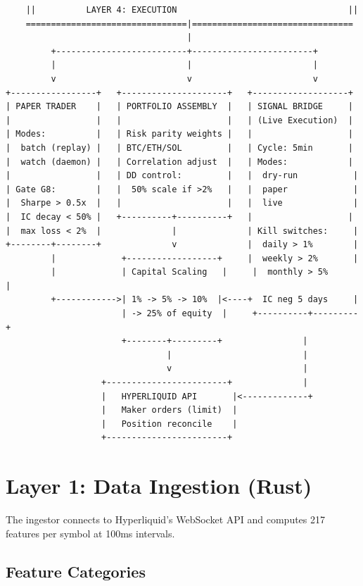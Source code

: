 \documentclass[11pt,a4paper]{article}
\begin{document}
{\begin{verbatim}
    ||          LAYER 4: EXECUTION                                  ||
    ================================|================================
                                    |
         +--------------------------+------------------------+
         |                          |                        |
         v                          v                        v
+-----------------+   +---------------------+   +-------------------+
| PAPER TRADER    |   | PORTFOLIO ASSEMBLY  |   | SIGNAL BRIDGE     |
|                 |   |                     |   | (Live Execution)  |
| Modes:          |   | Risk parity weights |   |                   |
|  batch (replay) |   | BTC/ETH/SOL         |   | Cycle: 5min       |
|  watch (daemon) |   | Correlation adjust  |   | Modes:            |
|                 |   | DD control:         |   |  dry-run           |
| Gate G8:        |   |  50% scale if >2%   |   |  paper             |
|  Sharpe > 0.5x  |   |                     |   |  live              |
|  IC decay < 50% |   +----------+----------+   |                   |
|  max loss < 2%  |              |              | Kill switches:     |
+--------+--------+              v              |  daily > 1%        |
         |             +------------------+     |  weekly > 2%       |
         |             | Capital Scaling   |     |  monthly > 5%      |
         +------------>| 1% -> 5% -> 10%  |<----+  IC neg 5 days     |
                       | -> 25% of equity  |     +----------+---------+
                       +--------+---------+                |
                                |                          |
                                v                          |
                   +------------------------+              |
                   |   HYPERLIQUID API       |<-------------+
                   |   Maker orders (limit)  |
                   |   Position reconcile    |
                   +------------------------+
\end{verbatim}
}

\clearpage
\section{Layer 1: Data Ingestion (Rust)}

The ingestor connects to Hyperliquid's WebSocket API and computes 217 features per symbol at 100ms intervals.

\subsection{Feature Categories}
\end{document}

